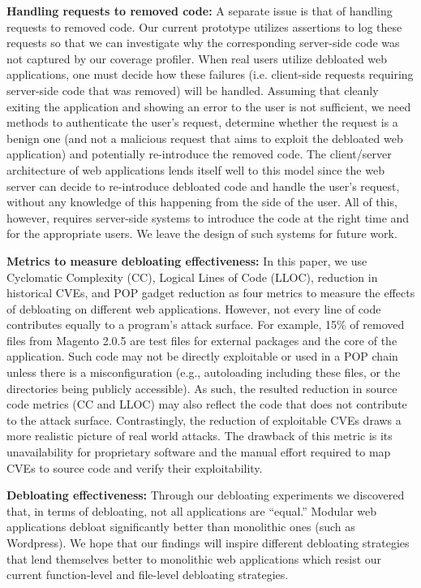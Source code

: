 \vspace{1ex}
\noindent\textbf{Handling requests to removed code:}
A separate issue is that of handling requests to removed code. Our
current prototype utilizes assertions to log these requests so that we can
investigate why the corresponding server-side code was not captured by our
coverage profiler. When real users utilize debloated web applications,
one must decide how these failures (i.e. client-side requests requiring
server-side code that was removed) will be handled. Assuming that cleanly
exiting the application and showing an error to the user is not sufficient,
we need methods to authenticate the user's request, determine whether the
request is a benign one (and not a malicious request that aims to exploit
the debloated web application) and potentially re-introduce the removed
code. The client/server architecture of web applications lends itself well
to this model since the web server can decide to re-introduce debloated code
and handle the user's request, without any knowledge of this happening from
the side of the user. All of this, however, requires server-side systems
to introduce the code at the right time and for the appropriate users. We
leave the design of such systems for future work.

\vspace{1ex}
\noindent\textbf{Metrics to measure debloating effectiveness:}
In this paper, we use Cyclomatic Complexity (CC), Logical Lines of Code
(LLOC), reduction in historical CVEs, and POP gadget reduction as four metrics to measure the
effects of debloating on different web applications. However, not every line of code
contributes equally to a program's attack surface. For example, 15\% of removed
files from Magento 2.0.5 are test files for external packages and
the core of the application. Such code may not be directly exploitable or
used in a POP chain unless there is a misconfiguration (e.g., autoloading
including these files, or the directories being publicly accessible). As such,
the resulted reduction in source code metrics (CC and LLOC) may also reflect the code
that does not contribute to the attack surface.
Contrastingly, the reduction of exploitable CVEs draws a more realistic picture
of real world attacks. The drawback of this metric is its unavailability for
proprietary software and the manual effort required to map CVEs to source
code and verify their exploitability.

\vspace{1ex}
\noindent\textbf{Debloating effectiveness:}
Through our debloating experiments we discovered that, in terms of debloating,
not all applications are ``equal.'' Modular web applications debloat
significantly better than monolithic ones (such as Wordpress). We hope that
our findings will inspire different debloating strategies that lend themselves
better to monolithic web applications which resist our current function-level
and file-level debloating strategies.




